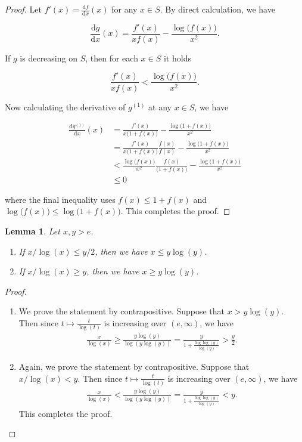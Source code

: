 \documentclass{article}
\newcommand{\D}{\textrm{d}}
\newtheorem{lemma}{Lemma}
\begin{document}
\begin{proof}
    Let $f'(x) = \frac{\D f}{\D x}(x)$ for any $x \in S$. By direct calculation, we have 

    \[\frac{\D g}{ \D x}(x) = \frac{f'(x)}{x f(x)} - \frac{\log \big(f(x)\big)}{x^2}.\]

    If $g$ is decreasing on $S$, then for each $x \in S$ it holds

    \[\frac{f'(x)}{x f(x)} < \frac{\log \big(f(x)\big)}{x^2}.\]

    Now calculating the derivative of $g^{(1)}$ at any $x \in S$, we have 

    \begin{align*}
        \frac{\D g^{(1)}}{\D x}(x) &= \frac{f'(x)}{x \big(1 + f(x)\big)} - \frac{\log \big(1 + f(x)\big)}{x^2} \\
        &= \frac{f'(x)}{x \big(1 + f(x)\big)}\frac{f(x)}{f(x)} - \frac{\log \big(1 + f(x)\big)}{x^2} \\
        &< \frac{\log \big(f(x)\big)}{x^2}\frac{f(x)}{\big(1 + f(x)\big)}- \frac{\log \big(1 + f(x)\big)}{x^2} \\
        &\leq 0
    \end{align*}

    where the final inequality uses $f(x) \leq 1 + f(x)$ and $\log\big(f(x)\big) \leq \log\big(1 + f(x)\big)$. This completes the proof.
\end{proof}

\begin{lemma}\label{lem_logs}
    Let $x,y > e$.
    \begin{enumerate}
        \item[(i)] If $x/\log(x) \leq y/2$, then we have $x \leq y \log(y)$.
        \item[(ii)] If $x/\log(x) \geq y$, then we have $x \geq y \log(y)$.
    \end{enumerate}
\end{lemma}
\begin{proof}
\begin{enumerate}
    \item[(i)] We prove the statement by contrapositive. Suppose that $x > y \log (y)$. Then since $t \mapsto \frac{t}{\log(t)}$ is increasing over $(e, \infty)$, we have
    \begin{align*}
        \frac{x}{\log(x)} \geq \frac{y \log(y)}{\log(y \log (y))} = \frac{y}{ 1 +\frac{\log \log(y)}{\log(y)}} > \frac{y}{2}.
    \end{align*}
    \item[(ii)] Again, we prove the statement by contrapositive. 
    Suppose that $x /\log(x) < y.$ Then since $t \mapsto \frac{t}{\log(t)}$ is increasing over $(e, \infty)$, we have
     \begin{align*}
        \frac{x}{\log(x)} < \frac{y \log(y)}{\log(y \log (y))} = \frac{y}{ 1 +\frac{\log \log(y)}{\log(y)}} < y.
    \end{align*}
    This completes the proof.
\end{enumerate}

    
\end{proof}
\end{document}

